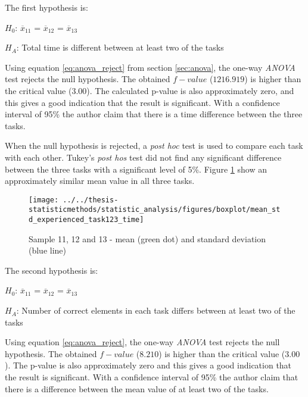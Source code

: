 The first hypothesis is:\\
\centerline{$H_{0}$: $\overline{x}_{11}$ = $\overline{x}_{12}$ = $\overline{x}_{13}$}
\centerline{$H_{A}$: Total time is different between at least two of the tasks}
\vspace{0.2cm}

Using equation \ref{eq:anova_reject}  from section \ref{sec:anova}, the one-way \textit{ANOVA} test rejects the null hypothesis. The obtained $f-value$ ($1216.919$) is higher than the critical value ($3.00$). The calculated p-value is also approximately zero, and this gives a good indication that the result is significant. With a confidence interval of 95\% the author claim that there is a time difference between the three tasks. 

When the null hypothesis is rejected, a \textit{post hoc} test is used to compare each task with each other. Tukey's \textit{post hos} test did not find any significant difference between the three tasks with a significant level of 5\%. Figure \ref{fig:meanstdexperiencedtask123time} show an approximately similar mean value in all three tasks. %

\begin{figure}[H]
	\centering
	\texttt{[image: ../../thesis-statisticmethods/statistic\_analysis/figures/boxplot/mean\_std\_experienced\_task123\_time]}
	\caption{Sample 11, 12 and 13 - mean (green dot) and standard deviation (blue line)}
	\label{fig:meanstdexperiencedtask123time}
\end{figure}


The second hypothesis is:\\
\centerline{$H_{0}$: $\overline{x}_11$ = $\overline{x}_12$ = $\overline{x}_13$}
\centerline{$H_{A}$: Number of correct elements in each task differs between at least two of the tasks}
\vspace{0.2cm}

Using equation \ref{eq:anova_reject}, the one-way \textit{ANOVA} test rejects the null hypothesis. The obtained $f-value$ ($8.210$) is higher than the critical value ($3.00$). The p-value is also approximately zero and this gives a good indication that the result is significant. With a confidence interval of 95\% the author claim that there is a difference between the mean value of at least two of the tasks. 

